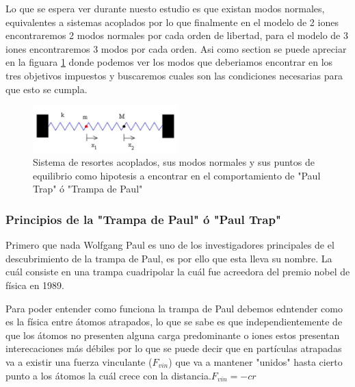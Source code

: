 \documentclass{article}
\begin{document}
Lo que se espera ver durante nuesto estudio es que existan modos normales, equivalentes
a sistemas acoplados por lo que finalmente en el modelo de 2 iones encontraremos 2 modos normales
por cada orden de libertad, para el modelo de 3 iones encontraremos 3 modos por cada orden. Asi como section
se puede apreciar en la figuara \ref{fig:sistemasacoplados} donde podemos ver los modos que
deberiamos encontrar en los tres objetivos impuestos y buscaremos cuales son las condiciones
necesarias para que esto se cumpla.

\begin{figure}
    \centering
    \includegraphics[width=0.5\textwidth]{sis_aco1.jpeg}
    \caption{Sistema de resortes acoplados, sus modos normales y sus puntos de equilibrio como hipotesis a encontrar en el comportamiento de "Paul Trap" ó "Trampa de Paul"}
    \label{fig:sistemasacoplados}
\end{figure}
\subsubsection*{Principios de la "Trampa de Paul" ó "Paul Trap"}

Primero que nada Wolfgang Paul es  uno de los investigadores principales de el descubrimiento de la trampa
de Paul, es por ello que esta lleva su nombre. La cuál consiste en una trampa cuadripolar
la cuál fue acreedora del premio nobel de física en 1989.\cite{hist_paul}

Para poder entender como funciona la trampa de Paul debemos edntender como es la física
entre átomos atrapados, lo que se sabe es que independientemente de que los átomos 
no presenten alguna carga predominante o iones estos presentan interecaciones más 
débiles por lo que se puede decir que en partículas atrapadas va a existir una fuerza
vinculante ($F_{vin}$) que va a mantener "unidos" hasta cierto punto a los átomos la cuál
crece con la distancia.$F_{vin}=-cr$
\end{document}
